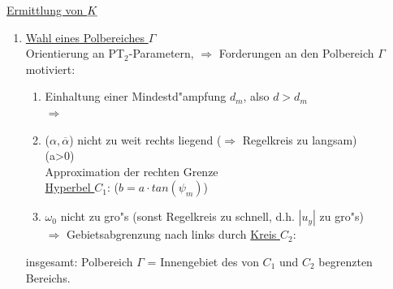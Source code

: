\documentclass[openany,a4paper,11pt]{book}
\begin{document}
\uline{Ermittlung von $\uline{K}$}\begin{enumerate}
    \item \uline{Wahl eines Polbereiches $\Gamma$}\\
    Orientierung an PT$_2$-Parametern,  $\Rightarrow$ Forderungen an den Polbereich $\Gamma$ motiviert:\begin{enumerate}
        \item Einhaltung einer Mindestd"ampfung $d_m$, also $d>d_m$\\
        $\Rightarrow$ 
        \item ($\alpha,\overline{\alpha}$) nicht zu weit rechts liegend ($\Rightarrow$ Regelkreis zu langsam)\\
         \quad (a>0)\\
        Approximation der rechten Grenze\\
        \uline{Hyperbel $C_1$}: \quad {} \quad ($b = a \cdot tan(\psi_m)$)
        \item $\omega_0$ nicht zu gro"s (sonst Regelkreis zu schnell, d.h. $|u_y|$ zu gro"s)\\
         $\Rightarrow$ Gebietsabgrenzung nach links durch \uline{Kreis $C_2$}: \quad {}\\
    \end{enumerate}
    insgesamt: Polbereich $\Gamma$ = Innengebiet des von $C_1$ und $C_2$ begrenzten Bereichs.
    \begin{tikzpicture}
	    

\end{tikzpicture}
\end{enumerate}
\end{document}

